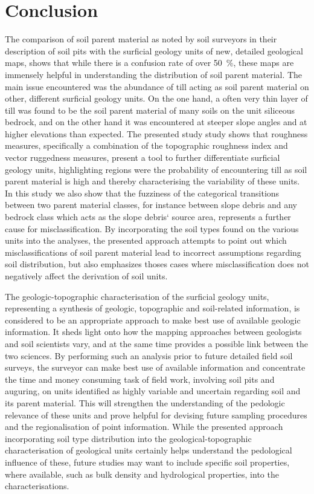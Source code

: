 \documentclass[preprint,12pt,authoryear]{elsarticle}
\begin{document}
\section{Conclusion}
 The comparison of soil parent material as noted by soil surveyors in their description of soil pits with the surficial geology units of new,  detailed geological maps, shows that while there is a confusion rate of over 50~\%, these maps are immensely helpful in understanding the distribution of soil parent material. The main issue encountered was the abundance of till acting as soil parent material on other, different surficial geology units. On the one hand, a often very thin layer of till was found to be the soil parent material of many soils on the unit siliceous bedrock, and on the other hand it was encountered  at steeper slope angles and at higher elevations than expected. The presented study study shows that roughness measures, specifically a combination of the topographic roughness index and  vector ruggedness measures, present a tool to further differentiate surficial geology units, highlighting regions were the probability of encountering till as soil parent material is high and thereby characterising the variability of these units. In this study we also show that the fuzziness of the  categorical transitions between two parent material classes, for instance between slope debris and any bedrock class which acts as the slope debris` source area, represents a further cause for misclassification. By incorporating the soil types found on the various units into the analyses, the presented approach attempts to point out which misclassifications of soil parent material lead to incorrect assumptions regarding soil distribution, but also emphasizes thoses cases where misclassification does not negatively affect the derivation of soil units. 

The geologic-topographic characterisation of the surficial geology units, representing a synthesis of geologic, topographic and soil-related information, is considered to be an appropriate approach to make best use of available geologic information.  It sheds light onto how the mapping approaches between geologists and soil scientists vary, and at the same time provides a possible link between the two sciences. By performing such an analysis prior to future detailed field soil surveys, the surveyor can make best use of available information and concentrate the time and money consuming task of field work, involving soil pits and auguring, on units identified as highly variable and uncertain regarding soil and its parent material. This will strengthen the understanding of the pedologic relevance of these units and prove  helpful for devising future sampling procedures and the regionalisation of point information. While the presented approach incorporating soil type distribution into the geological-topographic characterisation of geological units certainly helps understand the pedological influence of these, future studies may want to include specific soil properties, where available, such as bulk density and hydrological properties, into the characterisations.
\end{document}
